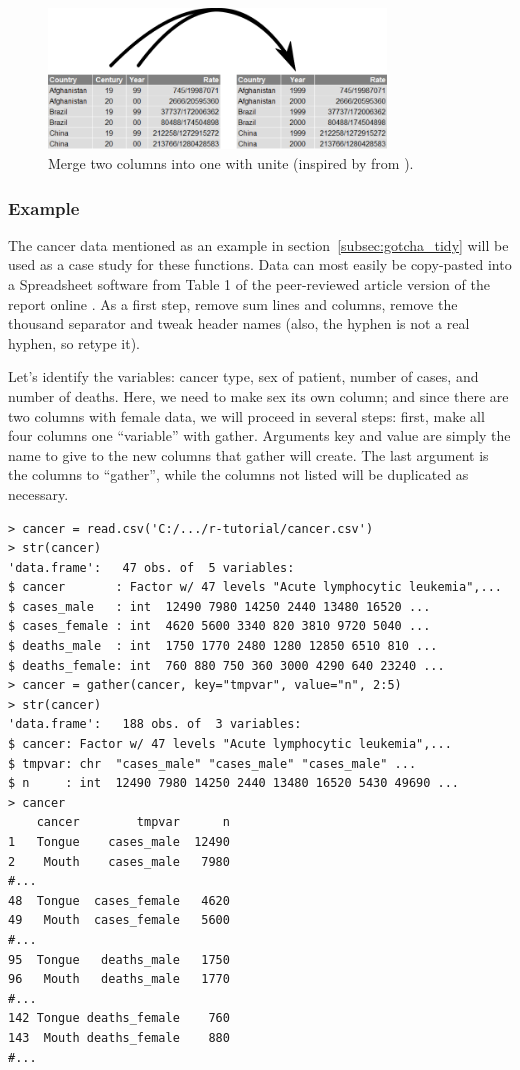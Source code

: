 \documentclass{report}
\newcommand{\code}[1]{\textsf{\ttfamily #1}}
\begin{document}
		\begin{figure}[h]
			\centering
			\includegraphics[width=0.8\textwidth]{unite.png}
			\caption{Merge two columns into one with \code{unite} (inspired by from \cite{tidy}).}
			\label{fig:unite}
		\end{figure}
	
		\subsubsection{Example}
		The cancer data mentioned as an example in section~\ref{subsec:gotcha_tidy} will be used as a case study for these functions. Data can most easily be copy-pasted into a Spreadsheet software from Table 1 of  the peer-reviewed article version of the report online \cite{siegel_cancer_2018}. As a first step, remove sum lines and columns, remove the thousand separator and tweak header names (also, the hyphen is not a real hyphen, so retype it). 
		
		Let's identify the variables: cancer type, sex of patient, number of cases, and number of deaths. Here, we need to make sex its own column; and since there are two columns with female data, we will proceed in several steps: first, make all four columns one ``variable'' with \code{gather}. Arguments \code{key} and \code{value} are simply the name to give to the new columns that \code{gather} will create. The last argument is the columns to ``gather'', while the columns not listed will be duplicated as necessary.
		\begin{verbatim}
> cancer = read.csv('C:/.../r-tutorial/cancer.csv')
> str(cancer)
'data.frame':   47 obs. of  5 variables:
$ cancer       : Factor w/ 47 levels "Acute lymphocytic leukemia",...
$ cases_male   : int  12490 7980 14250 2440 13480 16520 ...
$ cases_female : int  4620 5600 3340 820 3810 9720 5040 ...
$ deaths_male  : int  1750 1770 2480 1280 12850 6510 810 ...
$ deaths_female: int  760 880 750 360 3000 4290 640 23240 ...
> cancer = gather(cancer, key="tmpvar", value="n", 2:5)
> str(cancer)
'data.frame':   188 obs. of  3 variables:
$ cancer: Factor w/ 47 levels "Acute lymphocytic leukemia",...
$ tmpvar: chr  "cases_male" "cases_male" "cases_male" ...
$ n     : int  12490 7980 14250 2440 13480 16520 5430 49690 ...
> cancer
    cancer        tmpvar      n
1   Tongue    cases_male  12490
2    Mouth    cases_male   7980
#...
48  Tongue  cases_female   4620
49   Mouth  cases_female   5600
#...
95  Tongue   deaths_male   1750
96   Mouth   deaths_male   1770
#...
142 Tongue deaths_female    760
143  Mouth deaths_female    880
#...
		\end{verbatim}
		
\end{document}

